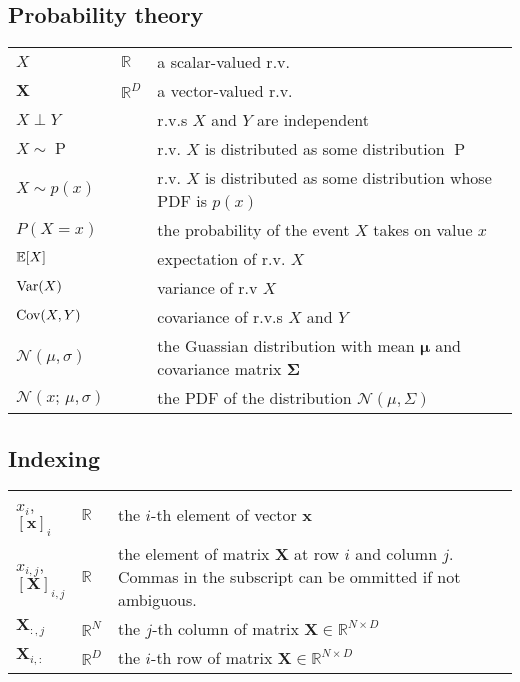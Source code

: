 \subsection*{Probability theory}
\begin{tabular}{p{0.13\linewidth}p{0.07\linewidth}p{0.80\linewidth}}
  $X$           & $\mathbb{R}$   & a scalar-valued r.v. \\
  $\bm{X}$      & $\mathbb{R}^D$ & a vector-valued r.v. \\
  $X \perp Y$   &                & r.v.s $X$ and $Y$ are independent \\
  $X \sim \operatorname{P}$    &                & r.v. $X$ is distributed as some distribution $\operatorname{P}$ \\
  $X \sim p(x)$ &                & r.v. $X$ is distributed as some distribution whose PDF is $p(x)$ \\
  $P(X = x)$    &                & the probability of the event $X$ takes on value $x$ \\
  $\mathbb{E}[X]$       &                & expectation of r.v. $X$ \\
  $\operatorname{Var}(X)$  &                & variance of r.v $X$ \\
  $\operatorname{Cov}(X, Y)$  &                & covariance of r.v.s $X$ and $Y$ \\
  $\mathcal{N}(\mu, \sigma)$ & & the Guassian distribution with mean $\bm\mu$ and covariance matrix $\bm\Sigma$ \\
  $\mathcal{N}(x;\, \mu, \sigma)$ & & the PDF of the distribution $\mathcal{N}(\mu, \Sigma)$ \\
\end{tabular}


\subsection*{Indexing}
\begin{tabular}{p{0.13\linewidth}p{0.07\linewidth}p{0.80\linewidth}}
  $x_i$,  $[\mathbf{x}]_i$         & $\mathbb{R}$   & the $i$-th element of vector $\mathbf{x}$ \\
  $x_{i,j}$, $[\mathbf{X}]_{i,j}$ & $\mathbb{R}$   & the element of matrix $\mathbf{X}$ at row $i$ and column $j$. Commas in the subscript can be ommitted if not ambiguous. \\
  $\mathbf{X}_{:,j}$              & $\mathbb{R}^N$ & the $j$-th column of matrix $\mathbf{X} \in \mathbb{R}^{N \times D}$  \\
  $\mathbf{X}_{i,:}$              & $\mathbb{R}^D$ & the $i$-th row of matrix $\mathbf{X} \in \mathbb{R}^{N \times D}$  \\
\end{tabular}

